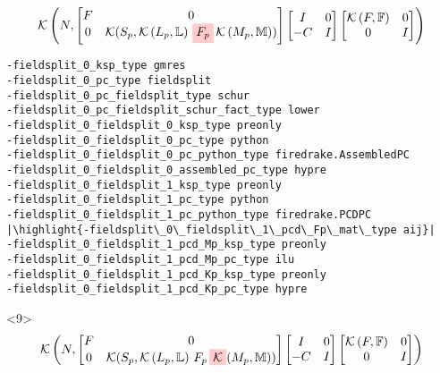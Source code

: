 \documentclass[presentation]{beamer}
\newcommand{\KSP}[2]{\ensuremath{\mathcal{K}\left(#1, \mathbb{#2}\right)}}
\newcommand{\ksp}[1]{\KSP{#1}{#1}}
\newcommand{\highlight}[1]{\colorbox{red!20}{\color{black} #1}}
\begin{document}
\begin{frame}[fragile]
\begin{onlyenv}
\begin{equation*}
      \KSP{N}{%
        \begin{bmatrix}
        F & 0 \\
        0 & \mathcal{K}(S_p, \KSP{L_p}{L}\,\highlight{$F_p$} \, \KSP{M_p}{M})
      \end{bmatrix}
      \begin{bmatrix}
        I & 0\\
        -C & I
      \end{bmatrix}
      \begin{bmatrix}
        \ksp{F} & 0 \\
        0 & I
      \end{bmatrix}}
    \end{equation*}
\begin{verbatim}
-fieldsplit_0_ksp_type gmres
-fieldsplit_0_pc_type fieldsplit
-fieldsplit_0_pc_fieldsplit_type schur
-fieldsplit_0_pc_fieldsplit_schur_fact_type lower
-fieldsplit_0_fieldsplit_0_ksp_type preonly
-fieldsplit_0_fieldsplit_0_pc_type python
-fieldsplit_0_fieldsplit_0_pc_python_type firedrake.AssembledPC
-fieldsplit_0_fieldsplit_0_assembled_pc_type hypre
-fieldsplit_0_fieldsplit_1_ksp_type preonly
-fieldsplit_0_fieldsplit_1_pc_type python
-fieldsplit_0_fieldsplit_1_pc_python_type firedrake.PCDPC
|\highlight{-fieldsplit\_0\_fieldsplit\_1\_pcd\_Fp\_mat\_type aij}|
-fieldsplit_0_fieldsplit_1_pcd_Mp_ksp_type preonly
-fieldsplit_0_fieldsplit_1_pcd_Mp_pc_type ilu
-fieldsplit_0_fieldsplit_1_pcd_Kp_ksp_type preonly
-fieldsplit_0_fieldsplit_1_pcd_Kp_pc_type hypre
\end{verbatim}
  \end{onlyenv}
  \begin{onlyenv}<9>
    \color{gray}
    \begin{equation*}
      \KSP{N}{%
      \begin{bmatrix}
        F & 0 \\
        0 & \mathcal{K}(S_p, \KSP{L_p}{L}\,F_p \, \highlight{$\mathcal{K}$}(M_p, \mathbb{M}))
      \end{bmatrix}
      \begin{bmatrix}
        I & 0\\
        -C & I
      \end{bmatrix}
      \begin{bmatrix}
        \ksp{F} & 0 \\
        0 & I
      \end{bmatrix}}
    \end{equation*}
\begin{verbatim}

\end{verbatim}
\end{onlyenv}
\end{frame}
\end{document}
